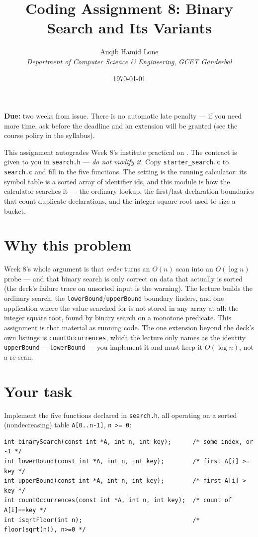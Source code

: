 \documentclass[11pt]{article}
\title{Coding Assignment 8: Binary Search and Its Variants}
\author{Auqib Hamid Lone\\[0.3em]
  \emph{Department of Computer Science \& Engineering}, \emph{GCET Ganderbal}}
\date{\today}
\begin{document}
\maketitle

\noindent\textbf{Due:} two weeks from issue. There is no automatic late penalty --- if you need more time, ask before the deadline and an extension will be granted (see the course policy in the syllabus).

\noindent This assignment autogrades Week 8's institute practical on . The contract is given to you in \texttt{search.h} --- \emph{do not modify it}. Copy \texttt{starter\_search.c} to \texttt{search.c} and fill in the five functions. The setting is the running calculator: its symbol table is a sorted array of identifier ids, and this module is how the calculator searches it --- the ordinary lookup, the first/last-declaration boundaries that count duplicate declarations, and the integer square root used to size a bucket.

\section{Why this problem}

Week 8's whole argument is that \emph{order} turns an $O(n)$ scan into an $O(\log n)$ probe --- and that binary search is only correct on data that actually is sorted (the deck's failure trace on unsorted input is the warning). The lecture builds the ordinary search, the \texttt{lowerBound}/\texttt{upperBound} boundary finders, and one application where the value searched for is not stored in any array at all: the integer square root, found by binary search on a monotone predicate. This assignment is that material as running code. The one extension beyond the deck's own listings is \texttt{countOccurrences}, which the lecture only names as the identity \texttt{upperBound} $-$ \texttt{lowerBound} --- you implement it and must keep it $O(\log n)$, not a re-scan.

\section{Your task}

Implement the five functions declared in \texttt{search.h}, all operating on a sorted (nondecreasing) table \texttt{A[0..n-1]}, \texttt{n >= 0}:

\begin{verbatim}
int binarySearch(const int *A, int n, int key);      /* some index, or -1 */
int lowerBound(const int *A, int n, int key);        /* first A[i] >= key */
int upperBound(const int *A, int n, int key);        /* first A[i] >  key */
int countOccurrences(const int *A, int n, int key);  /* count of A[i]==key */
int isqrtFloor(int n);                               /* floor(sqrt(n)), n>=0 */
\end{verbatim}
\end{document}
